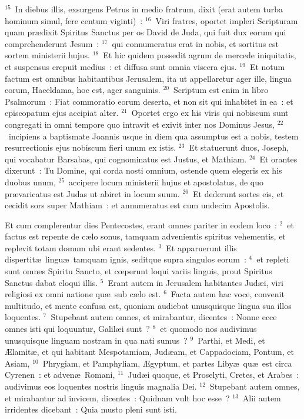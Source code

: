 ${}^{15}$~In diebus illis, exsurgens Petrus in medio fratrum, dixit (erat autem turba hominum simul, fere centum viginti)~:
${}^{16}$~Viri fratres, oportet impleri Scripturam quam pr\ae dixit Spiritus Sanctus per os David de Juda, qui fuit dux eorum qui comprehenderunt Jesum~:
${}^{17}$~qui connumeratus erat in nobis, et sortitus est sortem ministerii hujus.
${}^{18}$~Et hic quidem possedit agrum de mercede iniquitatis, et suspensus crepuit medius~: et diffusa sunt omnia viscera ejus.
${}^{19}$~Et notum factum est omnibus habitantibus Jerusalem, ita ut appellaretur ager ille, lingua eorum, Haceldama, hoc est, ager sanguinis.
${}^{20}$~Scriptum est enim in libro Psalmorum~: Fiat commoratio eorum deserta, et non sit qui inhabitet in ea~: et episcopatum ejus accipiat alter.
${}^{21}$~Oportet ergo ex his viris qui nobiscum sunt congregati in omni tempore quo intravit et exivit inter nos Dominus Jesus,
${}^{22}$~incipiens a baptismate Joannis usque in diem qua assumptus est a nobis, testem resurrectionis ejus nobiscum fieri unum ex istis.
${}^{23}$~Et statuerunt duos, Joseph, qui vocabatur Barsabas, qui cognominatus est Justus, et Mathiam.
${}^{24}$~Et orantes dixerunt~: Tu Domine, qui corda nosti omnium, ostende quem elegeris ex his duobus unum,
${}^{25}$~accipere locum ministerii hujus et apostolatus, de quo pr\ae varicatus est Judas ut abiret in locum suum.
${}^{26}$~Et dederunt sortes eis, et cecidit sors super Mathiam~: et annumeratus est cum undecim Apostolis.

\lettrine[lines=3,image=true,loversize=0.05,lraise=-0.03]{E}{}t cum complerentur dies Pentecostes, erant omnes pariter in eodem loco~:
${}^{2}$~et factus est repente de c\ae lo sonus, tamquam advenientis spiritus vehementis, et replevit totam domum ubi erant sedentes.
${}^{3}$~Et apparuerunt illis dispertit\ae\ lingu\ae\ tamquam ignis, seditque supra singulos eorum~:
${}^{4}$~et repleti sunt omnes Spiritu Sancto, et cœperunt loqui variis linguis, prout Spiritus Sanctus dabat eloqui illis.
${}^{5}$~Erant autem in Jerusalem habitantes Jud\ae i, viri religiosi ex omni natione qu\ae\ sub c\ae lo est.
${}^{6}$~Facta autem hac voce, convenit multitudo, et mente confusa est, quoniam audiebat unusquisque lingua sua illos loquentes.
${}^{7}$~Stupebant autem omnes, et mirabantur, dicentes~: Nonne ecce omnes isti qui loquuntur, Galil\ae i sunt~?
${}^{8}$~et quomodo nos audivimus unusquisque linguam nostram in qua nati sumus~?
${}^{9}$~Parthi, et Medi, et \AE lamit\ae , et qui habitant Mespotamiam, Jud\ae am, et Cappadociam, Pontum, et Asiam,
${}^{10}$~Phrygiam, et Pamphyliam, \AE gyptum, et partes Liby\ae\ qu\ae\ est circa Cyrenen~: et adven\ae\ Romani,
${}^{11}$~Jud\ae i quoque, et Proselyti, Cretes, et Arabes~: audivimus eos loquentes nostris linguis magnalia Dei.
${}^{12}$~Stupebant autem omnes, et mirabantur ad invicem, dicentes~: Quidnam vult hoc esse~?
${}^{13}$~Alii autem irridentes dicebant~: Quia musto pleni sunt isti.


